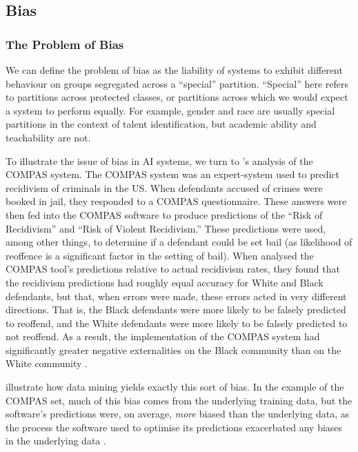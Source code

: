 \subsection{Bias}
\subsubsection{The Problem of Bias}
We can define the problem of bias as the liability of systems to exhibit different behaviour on groups segregated across a “special” partition. “Special” here refers to partitions across protected classes, or partitions across which we would expect a system to perform equally. For example, gender and race are usually special partitions in the context of talent identification, but academic ability and teachability are not. 

To illustrate the issue of bias in AI systems, we turn to \textcite{mattu_how_nodate}'s analysis of the COMPAS system. The COMPAS system was an expert-system used to predict recidivism of criminals in the US. When defendants accused of crimes were booked in jail, they responded to a COMPAS questionnaire. These answers were then fed into the COMPAS software to produce predictions of the “Risk of Recidivism” and “Risk of Violent Recidivism.” These predictions were used, among other things, to determine if a defendant could be set bail (as likelihood of reoffence is a significant factor in the setting of bail). When \textcite{mattu_how_nodate} analysed the COMPAS tool's predictions relative to actual recidivism rates, they found that the recidivism predictions had roughly equal accuracy for White and Black defendants, but that, when errors were made, these errors acted in very different directions. That is, the Black defendants were more likely to be falsely predicted to reoffend, and the White defendants were more likely to be falsely predicted to not reoffend. As a result, the implementation of the COMPAS system had significantly greater negative externalities on the Black community than on the White community \cite{mattu_how_nodate}.

\textcite{barocas_big_2016} illustrate how data mining yields exactly this sort of bias. In the example of the COMPAS set, much of this bias comes from the underlying training data, but the software's predictions were, on average, \emph{more} biased than the underlying data, as the process the software used to optimise its predictions exacerbated any biases in the underlying data \cite{barocas_big_2016}.

